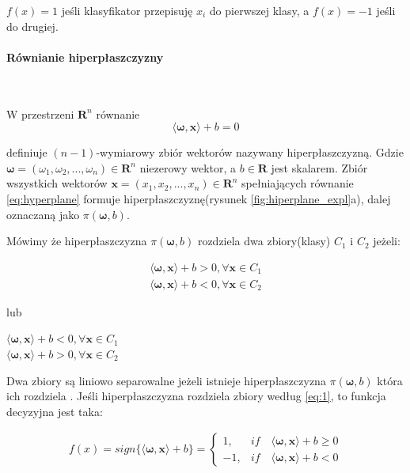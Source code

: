 \documentclass[paper=a4, fontsize=11pt]{scrartcl} %
\numberwithin{equation}{section} %
\numberwithin{figure}{section} %
\newcommand{\myparagraph}[1]{\paragraph{#1}\mbox{}\\}
\begin{document}
    $f(x)=1$ jeśli klasyfikator przepisuję $x_i$ do pierwszej klasy, a $f(x)=-1$ jeśli
    do drugiej.

\myparagraph{Równianie hiperpłaszczyzny}
    \par W przestrzeni $\pmb{R}^n$ równanie
    \begin{equation} \label{eq:hyperplane}
        \langle \pmb{\omega}, \pmb{x} \rangle + b = 0
    \end{equation}

    definiuje $(n-1)$-wymiarowy zbiór wektorów nazywany hiperpłaszczyzną. Gdzie 
    $\pmb{\omega} = (\omega_1,\omega_2,...,\omega_n) \in \pmb{R}^n$ niezerowy wektor, a $b \in
    \pmb{R}$ jest skalarem. Zbiór wszystkich wektorów $\pmb{x}=(x_1,x_2,...,x_n) \in \pmb{R}^n$
    spełniających równanie \ref{eq:hyperplane} formuje hiperpłaszczyznę(rysunek
    \ref{fig:hiperplane_expl}a), dalej oznaczaną jako $\pi(\pmb{\omega}, b)$.

    \par Mówimy że hiperpłaszczyzna $\pi(\pmb{\omega},b)$ rozdziela dwa zbiory(klasy) $C_1$ i
    $C_2$ jeżeli:

    \begin{equation} \label{eq:1}
    \begin{split}
        \langle \pmb{\omega}, \pmb{x} \rangle + b > 0, \forall \pmb{x} \in C_1 \\
        \langle \pmb{\omega}, \pmb{x} \rangle + b < 0, \forall \pmb{x} \in C_2 
    \end{split}
    \end{equation}

    lub 

    \begin{center}
        $\langle \pmb{\omega}, \pmb{x} \rangle + b < 0, \forall \pmb{x} \in C_1$ \\
        $\langle \pmb{\omega}, \pmb{x} \rangle + b > 0, \forall \pmb{x} \in C_2$
    \end{center}

    \par Dwa zbiory są liniowo separowalne jeżeli istnieje hiperpłaszczyzna
    $\pi(\pmb{\omega},b)$ która ich rozdziela \cite{nefedov2016support}. Jeśli hiperpłaszczyzna
    rozdziela zbiory według \ref{eq:1}, to funkcja decyzyjna jest taka:

    \begin{align} \label{eq:2}
        f(x) = sign\{\langle \pmb{\omega}, \pmb{x} \rangle + b\} = 
        \begin{cases}
            1,  & if \quad \langle \pmb{\omega}, \pmb{x} \rangle + b \geq 0 \\
            -1, & if \quad \langle \pmb{\omega}, \pmb{x} \rangle + b < 0
        \end{cases}
    \end{align}
\end{document}
